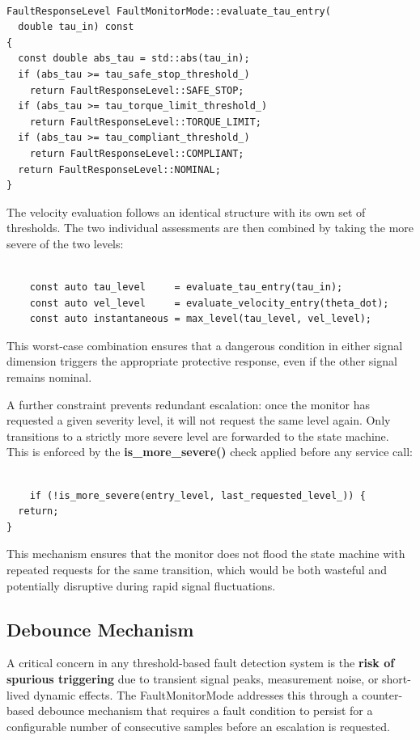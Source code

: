\begin{verbatim}

FaultResponseLevel FaultMonitorMode::evaluate_tau_entry(
  double tau_in) const
{
  const double abs_tau = std::abs(tau_in);
  if (abs_tau >= tau_safe_stop_threshold_)
    return FaultResponseLevel::SAFE_STOP;
  if (abs_tau >= tau_torque_limit_threshold_)
    return FaultResponseLevel::TORQUE_LIMIT;
  if (abs_tau >= tau_compliant_threshold_)
    return FaultResponseLevel::COMPLIANT;
  return FaultResponseLevel::NOMINAL;
}

\end{verbatim}

The velocity evaluation follows an identical structure with its own set of thresholds. The two individual assessments are then combined by taking the more severe of the two levels:

\begin{verbatim}

    const auto tau_level     = evaluate_tau_entry(tau_in);
    const auto vel_level     = evaluate_velocity_entry(theta_dot);
    const auto instantaneous = max_level(tau_level, vel_level);

\end{verbatim}

This worst-case combination ensures that a dangerous condition in either signal dimension triggers the appropriate protective response, even if the other signal remains nominal.

A further constraint prevents redundant escalation: once the monitor has requested a given severity level, it will not request the same level again. Only transitions to a strictly more severe level are forwarded to the state machine. This is enforced by the \textbf{is\_more\_severe()} check applied before any service call:

\begin{verbatim}

    if (!is_more_severe(entry_level, last_requested_level_)) {
  return;
}

\end{verbatim}

This mechanism ensures that the monitor does not flood the state machine with repeated requests for the same transition, which would be both wasteful and potentially disruptive during rapid signal fluctuations.

\subsection{Debounce Mechanism}
A critical concern in any threshold-based fault detection system is the \textbf{risk of spurious triggering} due to transient signal peaks, measurement noise, or short-lived dynamic effects. The FaultMonitorMode addresses this through a counter-based debounce mechanism that requires a fault condition to persist for a configurable number of consecutive samples before an escalation is requested.

